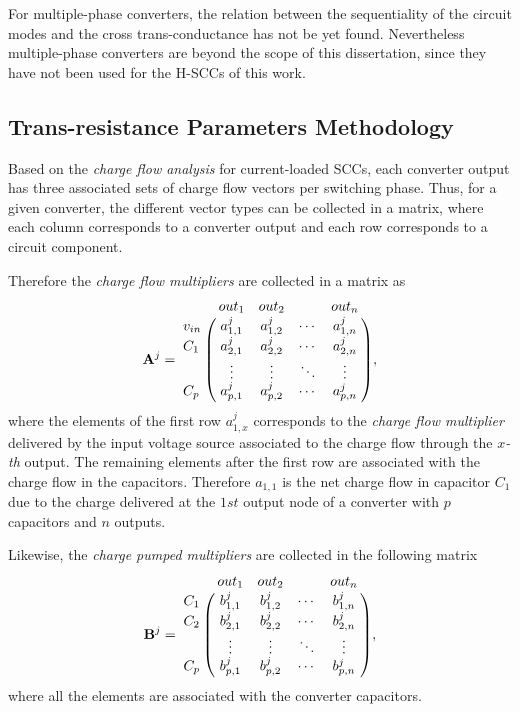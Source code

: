 For multiple-phase converters, the relation between the sequentiality of the circuit modes and the cross trans-conductance has not be yet found. Nevertheless multiple-phase converters are beyond the scope of this dissertation, since they have not been used for the H-SCCs of this work.

\subsection{Trans-resistance Parameters Methodology}

Based on the \emph{charge flow analysis} for current-loaded SCCs, each converter output has three associated sets of charge flow vectors per switching phase. Thus, for a given converter, the different vector types can be collected in a matrix, where each column corresponds to a converter output and each row corresponds to a circuit component.

Therefore the \emph{charge flow multipliers} are collected in a matrix as
\begin{equation}
 \mathbf{A}^j =
   \bordermatrix { ~ & out_1 & out_2 & ~ & out_n \cr
     v_{in} & a_{1,1}^j  & a_{1,2}^j & \cdots & a_{1,n}^j \cr
     C_1    & a_{2,1}^j  & a_{2,2}^j & \cdots & a_{2,n}^j \cr
      ~     & \vdots     & \vdots & \ddots & \vdots \cr
     C_p    & a_{p,1}^j  & a_{p,2}^j & \cdots & a_{p,n}^j \cr},
 \label{eq:A_matrix}
\end{equation}
where the elements of the first row  $a_{1,x}^j$ corresponds to the \emph{charge flow multiplier}  delivered by the input voltage source associated to the charge flow through the $x$\emph{-th} output. The remaining elements after the first row are associated with the charge flow in the capacitors. Therefore $a_{1,1}$ is the net charge flow in capacitor $C_1$ due to the charge delivered at the $1st$ output node of a converter with $p$ capacitors and $n$ outputs.

Likewise, the \emph{charge pumped multipliers} are collected in the following matrix
\begin{equation}
 \mathbf{B}^j =
   \bordermatrix { ~ & out_1 & out_2 & ~ & out_n \cr
     C_1  & b_{1,1}^j  & b_{1,2}^j & \cdots & b_{1,n}^j \cr
     C_2  & b_{2,1}^j  & b_{2,2}^j & \cdots & b_{2,n}^j \cr
      ~   & \vdots     & \vdots & \ddots & \vdots \cr
     C_p  & b_{p,1}^j  & b_{p,2}^j & \cdots & b_{p,n}^j \cr}
 \label{eq:A_matrix},
\end{equation}
where all the elements are associated with the converter capacitors.

